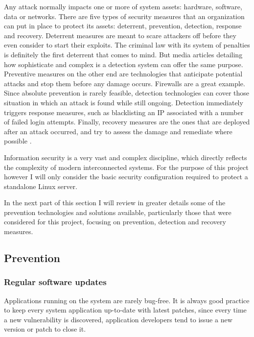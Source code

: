 Any attack normally impacts one or more of system assets: hardware, software,
data or networks. There are five types of security
measures that an organization can put in place to protect its assets:
deterrent, prevention, detection, response and recovery. Deterrent measures are
meant to scare attackers off before they even consider to start their exploits.
The criminal law with its system of penalties is definitely the first deterrent
that comes to mind. But media articles detailing how sophisticate and complex is
a detection system can offer the same purpose. Preventive measures on the other
end are technologies that anticipate potential attacks and stop them before any
damage occurs. Firewalls are a great example. Since absolute prevention
is rarely feasible, detection technologies can cover those situation in
which an attack is found while still ongoing. Detection immediately
triggers response measures, such as blacklisting an IP associated with a
number of failed login attempts. Finally, recovery measures are the ones that
are deployed after an attack occurred, and try to assess the damage and
remediate where possible \cite{BL04}.

Information security is a very vast and complex discipline, which
directly reflects the complexity of modern interconnected systems. For the
purpose of this project however I will only consider the basic security
configuration required to protect a standalone Linux server.

In the next part of this section I will review in greater details some of the
prevention technologies and solutions available, particularly those that were
considered for this project, focusing on prevention, detection and
recovery measures.

\subsection{Prevention}

\subsubsection{Regular software updates}
Applications running on the system are rarely bug-free. It is always good
practice to keep every system application up-to-date with latest patches, since
every time a new vulnerability is discovered, application developers tend
to issue a new version or patch to close it.

